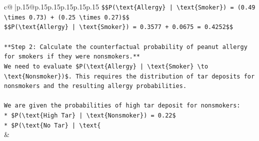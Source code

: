 \documentclass{article}
\begin{document}
{\begin{supertabular}{c@{$\;$}|p{.15\linewidth}@{}p{.15\linewidth}p{.15\linewidth}p{.15\linewidth}p{.15\linewidth}p{.15\linewidth}}
{{{\texttt{\$\$P(\textbackslash{}text\{Allergy\} | \textbackslash{}text\{Smoker\}) = (0.49 \textbackslash{}times 0.73) + (0.25 \textbackslash{}times 0.27)\$\$} \\
\texttt{\$\$P(\textbackslash{}text\{Allergy\} | \textbackslash{}text\{Smoker\}) = 0.3577 + 0.0675 = 0.4252\$\$} \\
\\ 
\texttt{**Step 2: Calculate the counterfactual probability of peanut allergy for smokers if they were nonsmokers.**} \\
\texttt{We need to evaluate \$P(\textbackslash{}text\{Allergy\} | \textbackslash{}text\{Smoker\} \textbackslash{}to \textbackslash{}text\{Nonsmoker\})\$. This requires the distribution of tar deposits for nonsmokers and the resulting allergy probabilities.} \\
\\ 
\texttt{We are given the probabilities of high tar deposit for nonsmokers:} \\
\texttt{*   \$P(\textbackslash{}text\{High Tar\} | \textbackslash{}text\{Nonsmoker\}) = 0.22\$} \\
\texttt{*   \$P(\textbackslash{}text\{No Tar\} | \textbackslash{}text\{} \\
            }
        }
    }
    & \\ \\


\end{supertabular}}
\end{document}
